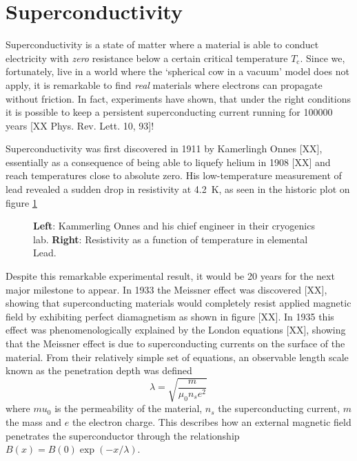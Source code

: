 \section{Superconductivity}
Superconductivity is a state of matter where a material is able to conduct electricity with \emph{zero} resistance below a certain critical temperature $T_\text{c}$. Since we, fortunately, live in a world where the `spherical cow in a vacuum' model does not apply, it is remarkable to find \emph{real} materials where electrons can propagate without friction. In fact, experiments have shown, that under the right conditions it is possible to keep a persistent superconducting current running for 100000 years [XX Phys. Rev. Lett. 10, 93]!

Superconductivity was first discovered in 1911 by Kamerlingh Onnes [XX], essentially as a consequence of being able to liquefy helium in 1908 [XX] and reach temperatures close to absolute zero. His low-temperature measurement of lead revealed a sudden drop in resistivity at \SI{4.2}{\kelvin}, as seen in the historic plot on figure \ref{fig:onnes}

\begin{figure}[]
    \centering
    \caption{\textbf{Left}: Kammerling Onnes and his chief engineer in their cryogenics lab. \textbf{Right}: Resistivity as a function of temperature in elemental Lead.}
    \label{fig:onnes}
\end{figure}

Despite this remarkable experimental result, it would be 20 years for the next major milestone to appear. In 1933 the Meissner effect was discovered [XX], showing that superconducting materials would completely resist applied magnetic field by exhibiting perfect diamagnetism as shown in figure [XX]. In 1935 this effect was phenomenologically explained by the London equations [XX], showing that the Meissner effect is due to superconducting currents on the surface of the material. From their relatively simple set of equations, an observable length scale known as the penetration depth was defined
%
\[ \lambda = \sqrt{\frac{m}{\mu_0 n_s e^2}} \, \]
%
where $mu_0$ is the permeability of the material, $n_s$ the superconducting current, $m$ the mass and $e$ the electron charge. This describes how an external magnetic field penetrates the superconductor through the relationship $B(x) = B(0) \exp (-x / \lambda)$. 

